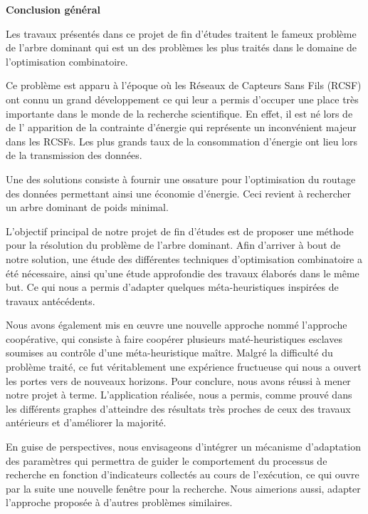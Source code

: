 

\begin{center}
	\LARGE\textbf{Conclusion général}
\end{center}


Les travaux présentés dans ce projet de fin d’études traitent le fameux problème de l’arbre dominant qui est un des problèmes les plus traités dans le domaine de l'optimisation combinatoire.

Ce problème est apparu à l’époque où les Réseaux de Capteurs Sans Fils (RCSF) ont connu un  grand développement ce qui leur a permis d’occuper une place très importante dans le monde de la recherche scientifique.  En effet, il est né lors de de l’ apparition de la contrainte d’énergie  qui représente un inconvénient majeur dans les RCSFs. Les plus grands taux de la consommation d’énergie ont lieu lors de la transmission des données.

Une des solutions consiste à fournir une ossature pour l’optimisation du routage des données permettant ainsi une économie d’énergie. Ceci revient à rechercher un arbre dominant de poids minimal.

L’objectif principal de notre projet de fin d’études est de proposer une méthode pour la résolution du problème de l’arbre dominant. Afin d’arriver à bout de notre solution, une étude des différentes techniques d’optimisation combinatoire a été nécessaire, ainsi qu’une étude approfondie des travaux élaborés dans le même but. Ce qui nous a permis  d'adapter quelques méta-heuristiques inspirées de travaux antécédents.

Nous avons également mis en œuvre une nouvelle approche nommé l’approche coopérative, qui consiste à faire coopérer plusieurs maté-heuristiques esclaves soumises au contrôle d'une méta-heuristique maître. Malgré la difficulté du problème traité, ce fut véritablement une expérience fructueuse qui nous a ouvert les portes vers de nouveaux horizons. Pour conclure, nous avons réussi à mener notre projet à terme. L’application réalisée, nous a permis, comme prouvé dans les différents graphes d’atteindre des résultats très proches de ceux des travaux antérieurs et d’améliorer la majorité. 

En guise de perspectives, nous envisageons d’intégrer un mécanisme d’adaptation des paramètres qui permettra de guider le comportement du processus de recherche en fonction d’indicateurs collectés au cours de l’exécution, ce qui ouvre par la suite une nouvelle fenêtre pour la recherche. Nous aimerions aussi, adapter l’approche proposée à d’autres problèmes similaires.
